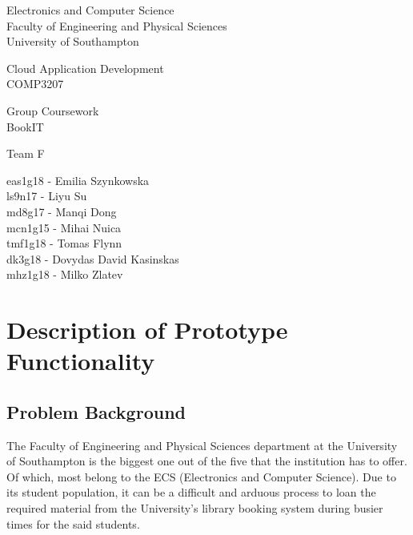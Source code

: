 \documentclass{article}
\begin{document}
\begin{titlepage}
   \begin{center}
       \vspace*{1cm}

       {\LARGE Electronics and Computer Science\\
        Faculty of Engineering and Physical Sciences\\
        University of Southampton\\}


       \vspace{2.0cm}
        {\huge Cloud Application Development\\
        COMP3207\\}

            
       \vspace{1.0cm}
       {\huge Group Coursework\\
       BookIT\\}  
       
    
      \vspace{2.0cm}
      {\huge Team F} 
      
      
      \vspace{0.25cm}
      {\LARGE eas1g18 - Emilia Szynkowska\\
                ls9n17 - Liyu Su\\
                md8g17 - Manqi Dong\\
                mcn1g15 - Mihai Nuica\\
                tmf1g18 - Tomas Flynn\\
                dk3g18 - Dovydas David Kasinskas\\
                mhz1g18 - Milko Zlatev\\}
         
        
   \end{center}
\end{titlepage}

\section{Description of Prototype Functionality}
\subsection{Problem Background}
The Faculty of Engineering and Physical Sciences department at the University of Southampton is the biggest one out of the five that the institution has to offer. Of which, most belong to the ECS (Electronics and Computer Science). Due to its student population, it can be a difficult and arduous process to loan the required material from the University's library booking system during busier times for the said students.
\end{document}
